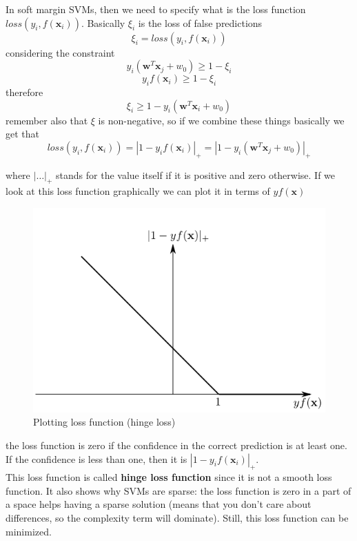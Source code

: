     In soft margin SVMs, then we need to specify what is the loss function $loss(y_i, f(\pmb{x}_i))$. 
    Basically $\xi_i$ is the loss of false predictions
    $$\xi_i = loss(y_i, f(\pmb{x}_i))$$
    considering the constraint
    $$y_i(\pmb{w}^T \pmb{x}_j + w_0) \geq 1 - \xi_i$$
    $$y_i f(\pmb{x}_i) \geq 1 - \xi_i$$
    therefore 
    $$\xi_i \geq 1 - y_i (\pmb{w}^T \pmb{x}_i + w_0)$$
    remember also that $\xi$ is non-negative, so if we combine these things basically we get that 
    \begin{equation}
        loss(y_i, f(\pmb{x}_i)) = |1 - y_i f(\pmb{x}_i)|_{+} = |1 - y_i(\pmb{w}^T \pmb{x}_j + w_0)|_{+}
    \end{equation}
    
    where $|\dots|_{+}$ stands for the value itself if it is positive and zero otherwise.
    If we look at this loss function graphically we can plot it in terms of $y f(\pmb{x})$
    \begin{figure}[ht]
        \centering
        \includegraphics[scale=0.5]{images/loss_fun_plot_SVMs.png}
        \caption{Plotting loss function (hinge loss)}
        \label{fig:plot_loss_fun}
    \end{figure}
    the loss function is zero if the confidence in the correct prediction is at least one. If the confidence is less than one, then it is $|1 - y_i f(\pmb{x}_i)|_{+}$.\\
    This loss function is called \textbf{hinge loss function} since it is not a smooth loss function. 
    It also shows why SVMs are sparse: the loss function is zero in a part of a space helps having a sparse solution (means that you don't care about differences, so the complexity term will dominate). 
    Still, this loss function can be minimized. 

